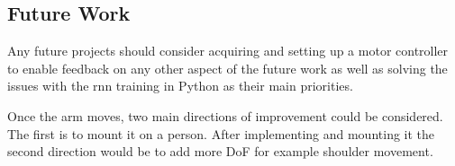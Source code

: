 \subsection{Future Work}

Any future projects should consider acquiring and setting up a motor controller to enable feedback on any other aspect of the future work
as well as solving the issues with the \acrshort{rnn} training in Python as their main priorities.

Once the arm moves, two main directions of improvement could be considered. The first is to mount it on a person. After implementing and mounting it the second direction would be to
add more DoF for example shoulder movement.